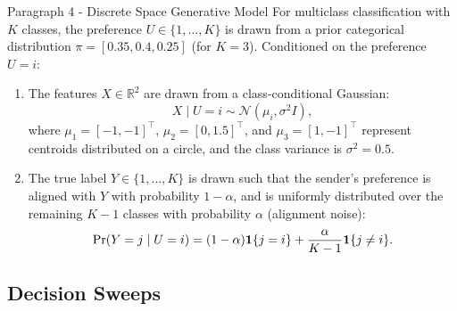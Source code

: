 \begin{sourceblock}{Paragraph 4 - Discrete Space Generative Model}
For multiclass classification with $K$ classes, the preference $U \in \{1, \dots, K\}$ is drawn from a prior categorical distribution $\pi = [0.35, 0.4, 0.25]$ (for $K=3$). Conditioned on the preference $U = i$:
\begin{enumerate}
    \item The features $X \in \mathbb{R}^2$ are drawn from a class-conditional Gaussian:
    \begin{equation}
        X \mid U = i \sim \mathcal{N}(\mu_i, \sigma^2 I),
    \end{equation}
    where $\mu_1 = [-1, -1]^\top$, $\mu_2 = [0, 1.5]^\top$, and $\mu_3 = [1, -1]^\top$ represent centroids distributed on a circle, and the class variance is $\sigma^2 = 0.5$.
    \item The true label $Y \in \{1, \dots, K\}$ is drawn such that the sender's preference is aligned with $Y$ with probability $1 - \alpha$, and is uniformly distributed over the remaining $K-1$ classes with probability $\alpha$ (alignment noise):
    \begin{equation}
        \Pr(Y = j \mid U = i) = (1 - \alpha) \mathbf{1}\{j = i\} + \frac{\alpha}{K - 1} \mathbf{1}\{j \ne i\}.
    \end{equation}
\end{enumerate}
\end{sourceblock}

\begin{faqblock}
\faqanswers
{}
\end{faqblock}

\subsection{Decision Sweeps}
\label{sec:exp_decision}

